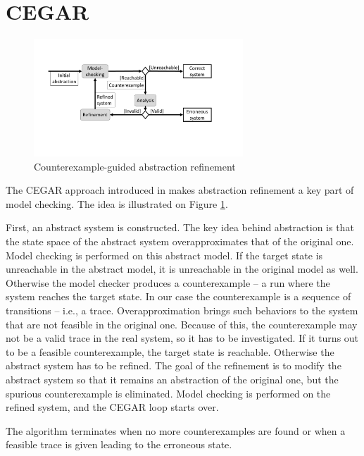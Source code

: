 \section{CEGAR}

\begin{figure} [b]
	\centering
	\includegraphics [width=0.7\textwidth] {include/figures/cegar_flow_black}
	\caption{Counterexample-guided abstraction refinement}
	\label{fig:cegar}
\end{figure}

The CEGAR approach introduced in \cite{clarke2003counterexample} makes
abstraction refinement a key part of model checking. The idea is illustrated on
Figure \ref{fig:cegar}.

First, an abstract system is constructed. The key idea behind abstraction is
that the state space of the abstract system overapproximates that of the original
one. 
Model checking is performed on this abstract model. If the target state is
unreachable in the abstract model, it is unreachable in the original model
as well. Otherwise the model checker produces a counterexample -- a run where the
system reaches the target state. In our case the counterexample is a sequence of
transitions -- i.e., a trace. Overapproximation brings such behaviors to the system that are not feasible in the original one. Because of this, the counterexample may not be a valid trace in the real system, so it has to be investigated.
If it turns
out to be a feasible counterexample, the target state is reachable. Otherwise
the abstract system has to be refined. The goal of the refinement is to modify the abstract
system so that it remains an abstraction of the original one, but the spurious
counterexample is eliminated.  Model checking is performed on the
refined system, and the CEGAR loop starts over. 

The algorithm terminates when no more
counterexamples are found or when a feasible trace is
given leading to the erroneous state.